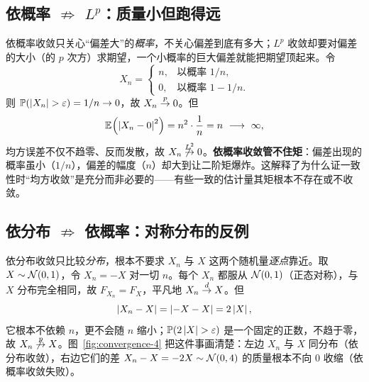 
\subsection*{依概率 $\not\Rightarrow$ $L^p$：质量小但跑得远}

依概率收敛只关心``偏差大''的\emph{概率}，不关心偏差到底有多大；$L^p$ 收敛却要对偏差的大小（的 $p$ 次方）求期望，一个小概率的巨大偏差就能把期望顶起来。令
\[
    X_n=\begin{cases} n, & \text{以概率 } 1/n,\\[2pt] 0, & \text{以概率 } 1-1/n.\end{cases}
\]
则 $\Prob{\abs{X_n}>\varepsilon}=1/n\to0$，故 $X_n\overset{p}{\to} 0$。但
\[
    \E{\abs{X_n-0}^2}=n^2\cdot\frac1n=n\ \longrightarrow\ \infty ,
\]
均方误差不仅不趋零、反而发散，故 $X_n\not\overset{L^{2}}{\to}0$。\textbf{依概率收敛管不住矩}：偏差出现的概率虽小（$1/n$），偏差的幅度（$n$）却大到让二阶矩爆炸。这解释了为什么证一致性时``均方收敛''是充分而非必要的——有些一致的估计量其矩根本不存在或不收敛。

\subsection*{依分布 $\not\Rightarrow$ 依概率：对称分布的反例}

依分布收敛只比较\emph{分布}，根本不要求 $X_n$ 与 $X$ 这两个随机量\emph{逐点}靠近。取 $X\sim\mathcal{N}(0,1)$，令 $X_n=-X$ 对一切 $n$。每个 $X_n$ 都服从 $\mathcal{N}(0,1)$（正态对称），与 $X$ 分布完全相同，故 $F_{X_n}=F_X$，平凡地 $X_n\overset{d}{\to} X$。但
\[
    \left|X_n-X\right|=\left|-X-X\right|=2\left|X\right|,
\]
它根本不依赖 $n$，更不会随 $n$ 缩小；$\Prob{2\abs{X}>\varepsilon}$ 是一个固定的正数，不趋于零，故 $X_n\not\overset{p}{\to} X$。图~\ref{fig:convergence-4} 把这件事画清楚：左边 $X_n$ 与 $X$ 同分布（依分布收敛），右边它们的差 $X_n-X=-2X\sim\mathcal{N}(0,4)$ 的质量根本不向 $0$ 收缩（依概率收敛失败）。

